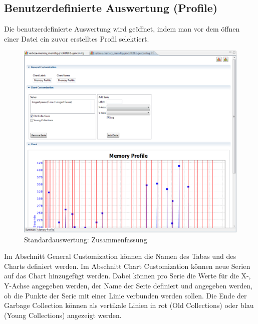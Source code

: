 \subsection{Benutzerdefinierte Auswertung (Profile)}
Die benutzerdefinierte Auswertung wird geöffnet, indem man vor dem öffnen einer Datei ein zuvor erstelltes Profil selektiert. 
 \begin{figure}[H]
  	\centering
    	\includegraphics[width=15cm]{images/tutorial_custom_report}
        	\caption{Standardauswertung: Zusammenfassung}
\end{figure}
Im Abschnitt General Customization können die Namen des Tabas und des Charts definiert werden. Im Abschnitt Chart Customization können neue Serien auf das Chart hinzugefügt werden. Dabei können pro Serie die Werte für die X-, Y-Achse angegeben werden, der Name der Serie definiert und angegeben werden, ob die Punkte der Serie mit einer Linie verbunden werden sollen. Die Ende der Garbage Collection können als vertikale Linien in rot (Old Collections) oder blau (Young Collections) angezeigt werden.

